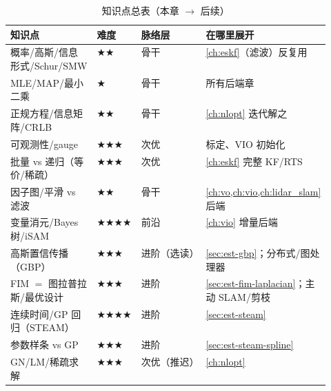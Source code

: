 \begin{table}[H]\centering\small
\caption{知识点总表（本章 $\to$ 后续）}
\begin{tabular}{p{0.27\linewidth}llp{0.27\linewidth}}
\toprule
知识点 & 难度 & 脉络层 & 在哪里展开 \\
\midrule
概率/高斯/信息形式/Schur/SMW & $\bigstar\bigstar$ & 骨干 & \cref{ch:eskf}（滤波）反复用 \\
MLE/MAP/最小二乘 & $\bigstar$ & 骨干 & 所有后端章 \\
正规方程/信息矩阵/CRLB & $\bigstar\bigstar$ & 骨干 & \cref{ch:nlopt} 迭代解之 \\
可观测性/gauge & $\bigstar\bigstar\bigstar$ & 次优 & 标定、VIO 初始化 \\
批量 vs 递归（等价/稀疏） & $\bigstar\bigstar\bigstar$ & 次优 & \cref{ch:eskf} 完整 KF/RTS \\
因子图/平滑 vs 滤波 & $\bigstar\bigstar$ & 骨干 & \cref{ch:vo,ch:vio,ch:lidar_slam} 后端 \\
变量消元/Bayes 树/iSAM & $\bigstar\bigstar\bigstar\bigstar$ & 前沿 & \cref{ch:vio} 增量后端 \\
高斯置信传播（GBP） & $\bigstar\bigstar\bigstar$ & 进阶（选读） & \cref{sec:est-gbp}；分布式/图处理器 \\
FIM $=$ 图拉普拉斯/最优设计 & $\bigstar\bigstar\bigstar$ & 进阶 & \cref{sec:est-fim-laplacian}；主动 SLAM/剪枝 \\
连续时间/GP 回归（STEAM） & $\bigstar\bigstar\bigstar\bigstar$ & 进阶 & \cref{sec:est-steam} \\
参数样条 vs GP & $\bigstar\bigstar\bigstar$ & 进阶 & \cref{sec:est-steam-spline} \\
GN/LM/稀疏求解 & $\bigstar\bigstar\bigstar$ & 次优（推迟） & \cref{ch:nlopt} \\
\bottomrule
\end{tabular}
\end{table}

